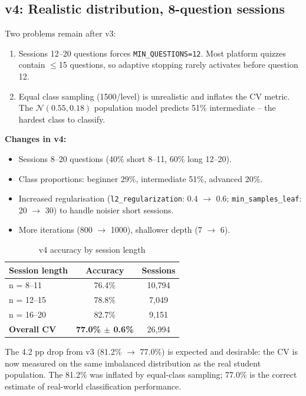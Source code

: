 \documentclass[12pt,a4paper]{article}
\begin{document}
\subsection{v4: Realistic distribution, 8-question sessions}
\label{sec:v4}

Two problems remain after v3:
\begin{enumerate}[noitemsep]
  \item Sessions 12--20 questions forces \texttt{MIN\_QUESTIONS=12}. Most platform
        quizzes contain $\leq$15 questions, so adaptive stopping rarely activates
        before question 12.
  \item Equal class sampling (1500/level) is unrealistic and inflates the CV metric.
        The $\mathcal{N}(0.55, 0.18)$ population model predicts 51\% intermediate --
        the hardest class to classify.
\end{enumerate}

\textbf{Changes in v4:}
\begin{itemize}[noitemsep]
  \item Sessions 8--20 questions (40\% short 8--11, 60\% long 12--20).
  \item Class proportions: beginner 29\%, intermediate 51\%, advanced 20\%.
  \item Increased regularisation (\texttt{l2\_regularization}: 0.4 $\to$ 0.6;
        \texttt{min\_samples\_leaf}: 20 $\to$ 30) to handle noisier short sessions.
  \item More iterations (800 $\to$ 1000), shallower depth (7 $\to$ 6).
\end{itemize}

\begin{table}[H]
\centering
\caption{v4 accuracy by session length}
\begin{tabular}{@{}lcc@{}}
\toprule
Session length & Accuracy & Sessions \\
\midrule
n = 8--11  & 76.4\% & 10,794 \\
n = 12--15 & 78.8\% & 7,049 \\
n = 16--20 & 82.7\% & 9,151 \\
\midrule
\textbf{Overall CV} & \textbf{77.0\% $\pm$ 0.6\%} & 26,994 \\
\bottomrule
\end{tabular}
\end{table}

The 4.2 pp drop from v3 (81.2\% $\to$ 77.0\%) is expected and desirable: the CV is
now measured on the same imbalanced distribution as the real student population.
The 81.2\% was inflated by equal-class sampling; 77.0\% is the correct estimate of
real-world classification performance.
\end{document}
